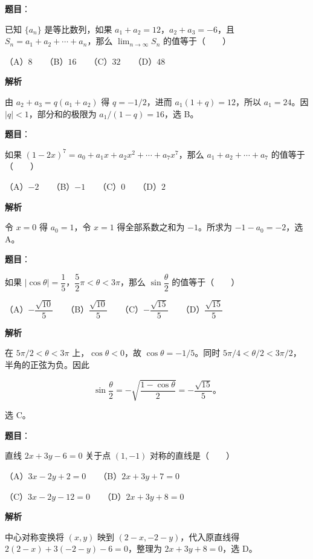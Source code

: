 \begin{answer}

\textbf{题目}：

已知 $\{a_n\}$ 是等比数列，如果 $a_1+a_2=12$，$a_2+a_3=-6$，且 $S_n=a_1+a_2+\cdots+a_n$，那么 $\displaystyle\lim_{n\to\infty}S_n$ 的值等于\mbox{（　　）}

（A）$8$　　（B）$16$　　（C）$32$　　（D）$48$

\textbf{解析}

由 $a_2+a_3=q(a_1+a_2)$ 得 $q=-1/2$，进而 $a_1(1+q)=12$，所以 $a_1=24$。因 $|q|<1$，部分和的极限为 $a_1/(1-q)=16$，选 B。


\end{answer}
\begin{answer}

\textbf{题目}：

如果 $(1-2x)^7=a_0+a_1x+a_2x^2+\cdots+a_7x^7$，那么 $a_1+a_2+\cdots+a_7$ 的值等于\mbox{（　　）}

（A）$-2$　　（B）$-1$　　（C）$0$　　（D）$2$

\textbf{解析}

令 $x=0$ 得 $a_0=1$，令 $x=1$ 得全部系数之和为 $-1$。所求为 $-1-a_0=-2$，选 A。


\end{answer}
\begin{answer}

\textbf{题目}：

如果 $|\cos\theta|=\dfrac15$，$\dfrac52\pi<\theta<3\pi$，那么 $\sin\dfrac\theta2$ 的值等于\mbox{（　　）}

（A）$-\dfrac{\sqrt{10}}5$　　（B）$\dfrac{\sqrt{10}}5$　　（C）$-\dfrac{\sqrt{15}}5$　　（D）$\dfrac{\sqrt{15}}5$

\textbf{解析}

在 $5\pi/2<\theta<3\pi$ 上，$\cos\theta<0$，故 $\cos\theta=-1/5$。同时 $5\pi/4<\theta/2<3\pi/2$，半角的正弦为负。因此

\nopagebreak[4]
\[
\sin\frac\theta2=-\sqrt{\frac{1-\cos\theta}{2}}=-\frac{\sqrt{15}}5\text{。}
\]

选 C。


\end{answer}
\begin{answer}

\textbf{题目}：

直线 $2x+3y-6=0$ 关于点 $(1,-1)$ 对称的直线是\mbox{（　　）}

（A）$3x-2y+2=0$　　（B）$2x+3y+7=0$

（C）$3x-2y-12=0$　　（D）$2x+3y+8=0$

\textbf{解析}

中心对称变换将 $(x,y)$ 映到 $(2-x,-2-y)$，代入原直线得 $2(2-x)+3(-2-y)-6=0$，整理为 $2x+3y+8=0$，选 D。


\end{answer}
